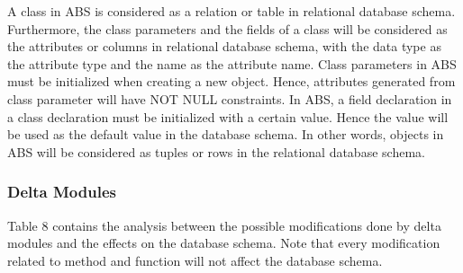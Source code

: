 \documentclass[runningheads,a4paper]{llncs}
\begin{document}
A class in ABS is considered as a relation or table in relational database schema. Furthermore, the class parameters and the fields of a class will be considered as the attributes or columns in relational database schema, with the data type as the attribute type and the name as the attribute name. Class parameters in ABS must be initialized when creating a new object. Hence, attributes generated from class parameter will have NOT NULL constraints. In ABS, a field declaration in a class declaration must be initialized with a certain value. Hence the value will be used as the default value in the database schema. In other words, objects in ABS will be considered as tuples or rows in the relational database schema.

\subsubsection*{Delta Modules}
Table 8 contains the analysis between the possible modifications done by delta modules and the effects on the database schema. Note that every modification related to method and function will not affect the database schema.
\end{document}
